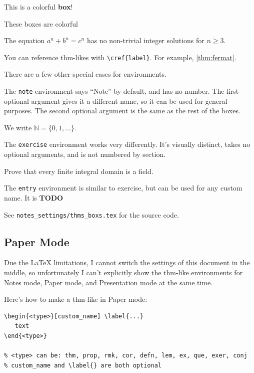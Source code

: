 \documentclass[10pt]{article}
\newcommand{\N}{\mathbb{N}}
\begin{document}
\begin{defn}
    This is a colorful \textbf{box}!
\end{defn}

\begin{ex}
    These boxes are colorful
\end{ex}

\begin{thm}
    The equation $a^n+b^n=c^n$ has no non-trivial integer solutions for $n \geq 3$.
\end{thm}

You can reference thm-likes with \verb|\cref{label}|. For example, \cref{thm:fermat}.

There are a few other special cases for environments. 

The \verb|note| environment says ``Note'' by default, and has no number. The first optional argument gives it a different name, so it can be used for general purposes. The second optional argument is the same as the rest of the boxes.

\begin{note}[Notation]
    We write $\N = \{0,1,\dots\}$.
\end{note}

The \verb|exercise| environment works very differently. It's visually distinct, takes no optional arguments, and is not numbered by section.

\begin{exercise}
    Prove that every finite integral domain is a field.
\end{exercise}

The \verb|entry| environment is similar to exercise, but can be used for any custom name. It is \textbf{TODO}

See \verb|notes_settings/thms_boxs.tex| for the source code.

\subsection{Paper Mode}

Due the LaTeX limitations, I cannot switch the settings of this document in the middle, so unfortunately I can't explicitly show the thm-like environments for Notes mode, Paper mode, and Presentation mode at the same time.

Here's how to make a thm-like in Paper mode:
\begin{lstlisting}[language={[LaTeX]TeX}]
\begin{<type>}[custom_name] \label{...}
   text
\end{<type>}

% <type> can be: thm, prop, rmk, cor, defn, lem, ex, que, exer, conj
% custom_name and \label{} are both optional
\end{lstlisting}
\end{document}
